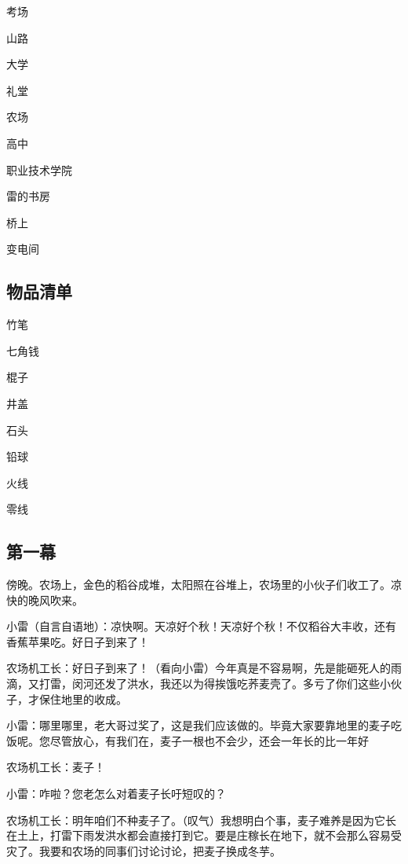 \documentclass[UTF8,12pt,oneside]{ctexbook}
\begin{document}
        考场
        
        山路
        
        大学
        
        礼堂
        
        农场
        
        高中
        
        职业技术学院
        
        雷的书房
        
        桥上
        
        变电间
    
    \subsection{物品清单}
        竹笔
        
        七角钱
        
        棍子
        
        井盖
        
        石头
        
        铅球
        
        火线
        
        零线
    
    \subsection{第一幕}
    \fangsong
    傍晚。农场上，金色的稻谷成堆，太阳照在谷堆上，农场里的小伙子们收工了。凉快的晚风吹来。
    
    \songti
    小雷（自言自语地）：凉快啊。天凉好个秋！天凉好个秋！不仅稻谷大丰收，还有香蕉苹果吃。好日子到来了！
    
    农场机工长：好日子到来了！（看向小雷）今年真是不容易啊，先是能砸死人的雨滴，又打雷，闵河还发了洪水，我还以为得挨饿吃荞麦壳了。多亏了你们这些小伙子，才保住地里的收成。
    
    小雷：哪里哪里，老大哥过奖了，这是我们应该做的。毕竟大家要靠地里的麦子吃饭呢。您尽管放心，有我们在，麦子一根也不会少，还会一年长的比一年好
    
    农场机工长：麦子！
    
    小雷：咋啦？您老怎么对着麦子长吁短叹的？
    
    农场机工长：明年咱们不种麦子了。（叹气）我想明白个事，麦子难养是因为它长在土上，打雷下雨发洪水都会直接打到它。要是庄稼长在地下，就不会那么容易受灾了。我要和农场的同事们讨论讨论，把麦子换成冬芋。
    
\end{document}
